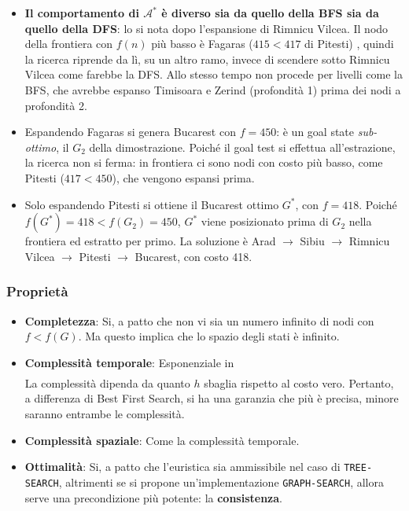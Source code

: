 \documentclass[a4paper, 11pt, oneside]{book}
\theoremstyle{definition}
\begin{document}
	\begin{itemize}
		\item \textbf{Il comportamento di $\mathcal{A}^*$ \`e diverso sia da quello della BFS
			sia da quello della DFS}: lo si nota dopo l'espansione di Rimnicu Vilcea. 
            Il nodo della frontiera con $f(n)$ pi\`u basso \`e Fagaras ($415 < 417$ di Pitesti)
            , quindi la ricerca riprende da l\`i, su un altro ramo, invece di scendere sotto 
            Rimnicu Vilcea come farebbe la DFS. Allo stesso tempo non procede 
            per livelli come la BFS, che avrebbe espanso Timisoara e Zerind (profondit\`a 1) 
            prima dei nodi a profondit\`a 2.

		\item Espandendo Fagaras si genera Bucarest con $f = 450$: \`e un goal state
			\emph{sub-ottimo}, il $G_2$ della dimostrazione. Poich\'e il goal test si effettua
			all'estrazione, la ricerca non si ferma: in frontiera ci sono nodi con costo pi\`u
			basso, come Pitesti ($417 < 450$), che vengono espansi prima.

		\item Solo espandendo Pitesti si ottiene il Bucarest ottimo $G^*$, con $f = 418$.
			Poich\'e $f(G^*) = 418 < f(G_2) = 450$, $G^*$ viene posizionato prima di $G_2$
            nella frontiera ed estratto per primo. La soluzione \`e Arad $\rightarrow$ Sibiu
			$\rightarrow$ Rimnicu Vilcea $\rightarrow$ Pitesti $\rightarrow$ Bucarest, 
            con costo 418.
	\end{itemize}

	\subsubsection*{Propriet\`a}
	\begin{itemize}
		\item \textbf{Completezza}: Si, a patto che non vi sia un numero infinito
            di nodi con $f < f(G)$. Ma questo implica che lo spazio degli stati \`e
            infinito.

        \item \textbf{Complessit\`a temporale}: Esponenziale in 
            \begin{gather*}
                [\text{errore relativo dell'euristica $h$ \times \space 
                profondit\`a della soluzione $d$}]
            \end{gather*}
            La complessit\`a dipenda da quanto $h$ sbaglia rispetto al costo vero.
            Pertanto, a differenza di Best First Search, si ha una garanzia che pi\`u
            \`e precisa, minore saranno entrambe le complessit\`a.

		\item \textbf{Complessit\`a spaziale}: Come la complessit\`a temporale.

		\item \textbf{Ottimalit\`a}: Si, a patto che l'euristica sia ammissibile nel caso
            di \texttt{TREE-SEARCH}, altrimenti se si propone un'implementazione 
            \texttt{GRAPH-SEARCH}, allora serve una precondizione pi\`u potente: la 
            \textbf{consistenza}.
	\end{itemize}
\end{document}
